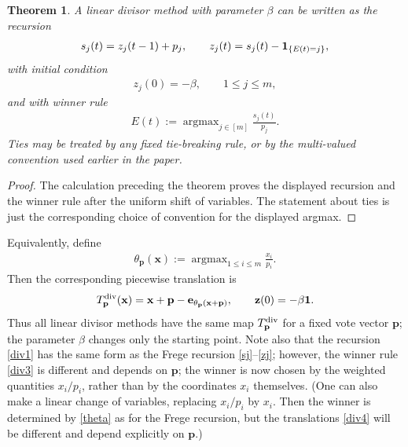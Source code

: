 \documentclass[11pt,reqno,tbtags,a4paper]{amsart}
\numberwithin{equation}{section}
\renewcommand\le{\leq}
\renewcommand\leq{\leqslant}
\theoremstyle{plain}%
\newtheorem{theorem}{Theorem}[section]
\theoremstyle{definition}
\theoremstyle{remark}
\newcommand\argmax{\operatorname{argmax}}
\newcommand\ve{\mathbf{e}}
\newcommand\vp{\mathbf{p}}
\newcommand\vx{\mathbf{x}}
\newcommand\vz{\mathbf{z}}
\newcommand\0{{\boldsymbol 0}}
\newcommand\1{{\boldsymbol 1}}
\begin{document}
\begin{theorem}\label{Tdivisor}
A linear divisor method with parameter $\beta$ can be written as the recursion
\begin{align}\label{div1}
        s_j(t)=z_j(t-1)+p_j,
        \qquad
        z_j(t)=s_j(t)-{\bf 1}_{\{E(t)=j\}},
\end{align}
with initial condition
\begin{align}\label{div2}
        z_j(0)=-\beta,
        \qquad 1\le j\le m,
\end{align}
and with winner rule
\begin{align}\label{div3}
        E(t):=\argmax_{j\in[m]} \frac{s_j(t)}{p_j}.
\end{align}
Ties may be treated by any fixed tie-breaking rule, or by the multi-valued
convention used earlier in the paper.
\end{theorem}

\begin{proof}
The calculation preceding the theorem proves the displayed recursion and the
winner rule after the uniform shift of variables.  The statement about ties is
just the corresponding choice of convention for the displayed argmax.
\end{proof}

Equivalently, define
\begin{align}\label{thetap}
        \theta_{\vp}(\vx):=\argmax_{1\le i\le m} \frac{x_i}{p_i}.
\end{align}
Then the corresponding piecewise translation is
\begin{align}\label{div4}
        T_{\vp}^{\rm div}(\vx)=\vx+\vp-\ve_{\theta_{\vp}(\vx+\vp)},
        \qquad
        \vz(0)=-\beta\1 .
\end{align}
Thus all linear divisor methods have the same map $T_{\vp}^{\rm div}$ for a
fixed vote vector $\vp$;  the parameter $\beta$ changes only the starting point.
Note also that the recursion \eqref{div1} has the same form as the Frege
recursion \eqref{sj}--\eqref{zj};
however, the winner rule \eqref{div3} is different and depends on $\vp$;
the winner is now chosen by the weighted quantities $x_i/p_i$, rather than
by the coordinates $x_i$ themselves.
(One can also make a linear change of variables, replacing $x_i/p_i$ by $x_i$.
Then the winner is determined by \eqref{theta} as for the Frege recursion,
but the translations \eqref{div4} will be different and depend explicitly on
$\vp$.)
\end{document}
